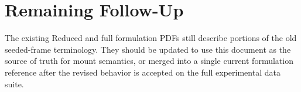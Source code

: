 \documentclass[11pt]{article}
\begin{document}
\section{Remaining Follow-Up}

The existing Reduced and full formulation PDFs still describe portions of the old
seeded-frame terminology. They should be updated to use this document as the
source of truth for mount semantics, or merged into a single current
formulation reference after the revised behavior is accepted on the full
experimental data suite.
\end{document}
